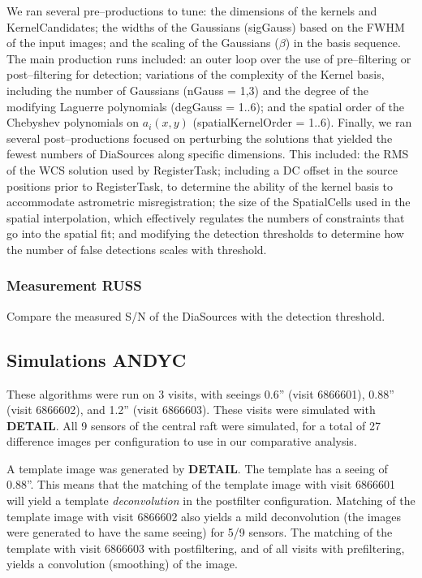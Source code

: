 \documentclass[prd, nofootinbib, floatfix, 11pt,tightenlines,times]{article}
\begin{document}
We ran several pre--productions to tune: the dimensions of the kernels
and KernelCandidates; the widths of the Gaussians (sigGauss) based on
the FWHM of the input images; and the scaling of the Gaussians
($\beta$) in the basis sequence.  The main production runs included:
an outer loop over the use of pre--filtering or post--filtering for
detection; variations of the complexity of the Kernel basis, including
the number of Gaussians (nGauss = 1,3) and the degree of the modifying
Laguerre polynomials (degGauss = 1..6); and the spatial order of the
Chebyshev polynomials on $a_i(x,y)$ (spatialKernelOrder = 1..6).
Finally, we ran several post--productions focused on perturbing the
solutions that yielded the fewest numbers of DiaSources along specific
dimensions.  This included: the RMS of the WCS solution used by
RegisterTask; including a DC offset in the source positions prior to
RegisterTask, to determine the ability of the kernel basis to
accommodate astrometric misregistration; the size of the SpatialCells
used in the spatial interpolation, which effectively regulates the
numbers of constraints that go into the spatial fit; and modifying the
detection thresholds to determine how the number of false detections
scales with threshold.

\subsubsection{Measurement {\bf RUSS}}

Compare the measured S/N of the DiaSources with the detection threshold.

\subsection{Simulations {\bf ANDYC}}

These algorithms were run on 3 visits, with seeings 0.6'' (visit
6866601), 0.88'' (visit 6866602), and 1.2'' (visit 6866603).  These
visits were simulated with {\bf DETAIL}.  All 9 sensors of the central
raft were simulated, for a total of 27 difference images per
configuration to use in our comparative analysis.

A template image was generated by {\bf DETAIL}.  The template has a
seeing of 0.88''.  This means that the matching of the template image
with visit 6866601 will yield a template {\it deconvolution} in the
postfilter configuration.  Matching of the template image with visit
6866602 also yields a mild deconvolution (the images were generated to
have the same seeing) for 5/9 sensors.  The matching of the template
with visit 6866603 with postfiltering, and of all visits with
prefiltering, yields a convolution (smoothing) of the image.
\end{document}
